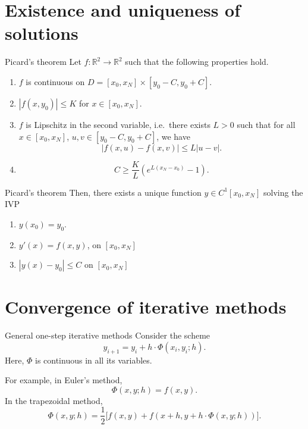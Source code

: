 \documentclass{beamer}
\def\R{\mathbb{R}}
\begin{document}
    \section{Existence and uniqueness of solutions}
    

    \begin{frame}{Picard's theorem}
        Let $f\colon \R^2 \to \R^2$ such that the following properties hold. 
        \begin{enumerate}
            \item $f$ is continuous on $D = [x_0, x_N] \times [y_0 - C, y_0 + C]$.
            \item $|f(x, y_0)| \leq K$ for $x \in [x_0, x_N]$.
            \item $f$ is Lipschitz in the second variable, i.e.\ there exists $L > 0$
            such that for all $x \in [x_0, x_N]$, $u, v \in [y_0 - C, y_0 + C]$,
            we have \[
                |f(x, u) - f(x, v)| \leq L|u - v|.
            \]
            \item \[
                C \geq \frac{K}{L}\left(e^{L(x_N - x_0)} - 1\right).
            \]
        \end{enumerate}
    \end{frame}
    
    \begin{frame}{Picard's theorem}
        Then, there exists a unique function $y \in C^1[x_0, x_N]$ solving the IVP
        \begin{enumerate}
            \item $y(x_0) = y_0$.
            \item $y'(x) = f(x, y)$, on $[x_0, x_N]$
            \item $|y(x) - y_0| \leq C$ on $[x_0, x_N]$
        \end{enumerate}
    \end{frame}

    
    \section{Convergence of iterative methods}

    \begin{frame}{General one-step iterative methods}
        Consider the scheme \[
            y_{i + 1} = y_i + h\cdot \Phi(x_i, y_i; h).
        \] Here, $\Phi$ is continuous in all its variables.

        For example, in Euler's method, \[
            \Phi(x, y; h) = f(x, y).
        \] In the trapezoidal method, \[
            \Phi(x, y; h) = \frac{1}{2}\Big[f(x, y) + f(x + h, y + h\cdot \Phi(x, y;
            h))\Big].
        \] 
    \end{frame}
\end{document}
